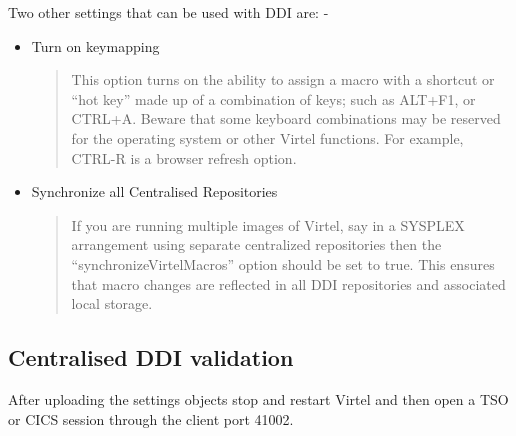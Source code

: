 \documentclass[letterpaper,10pt,english]{sphinxmanual}
\begin{document}
Two other settings that can be used with DDI are: -
\begin{itemize}
\item {} 
                        Turn on keymapping
\begin{quote}

This option turns on the ability to assign a macro with a shortcut or “hot key” made up of a combination of keys; such as ALT+F1, or CTRL+A.  Beware that some keyboard combinations may be reserved for the operating system or other Virtel functions. For example, CTRL-R is a browser refresh option.
\end{quote}

\item {} 
           Synchronize all Centralised Repositories
\begin{quote}

If you are running multiple images of Virtel, say in a SYSPLEX arrangement using separate centralized repositories then the “synchronizeVirtelMacros” option should be set to true. This ensures that macro changes are reflected in all DDI repositories and associated local storage.
\end{quote}

\end{itemize}

\ignorespaces 

\subsection{Centralised DDI validation}
\label{\detokenize{Customization:centralised-ddi-validation}}\label{\detokenize{Customization:index-89}}
After uploading the settings objects stop and restart Virtel and then open a TSO or CICS session through the client port 41002.

\begin{sphinxVerbatim}[commandchars=\\\{\}]
\end{sphinxVerbatim}
\end{document}
